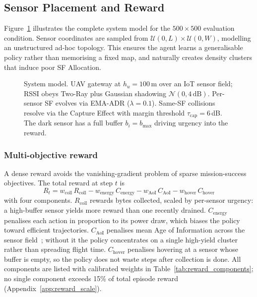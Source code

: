\subsection{Sensor Placement and Reward}

Figure~\ref{fig:system_model} illustrates the complete system model
for the $500\times 500$ evaluation condition. Sensor coordinates are
sampled from $\mathcal{U}(0, L)\times\mathcal{U}(0, W)$, modelling an
unstructured ad-hoc topology. This ensures the agent learns a
generalisable policy rather than memorising a fixed map, and
naturally creates density clusters that induce poor SF Allocation.

\begin{figure}[htbp]
    \centering
    \resizebox{0.95\linewidth}{!}{}
    \caption{System model. UAV gateway at $h_u = 100$\,m over an
    IoT sensor field; RSSI obeys Two-Ray plus Gaussian shadowing
    $\mathcal{N}(0, 4\,\mathrm{dB})$. Per-sensor SF evolves via
    EMA-ADR ($\lambda = 0.1$). Same-SF collisions resolve via the
    Capture Effect with margin threshold
    $\tau_{\mathrm{cap}} = 6$\,dB. The dark sensor has a full buffer
    $b_i = b_{\max}$ driving urgency into the reward.}
    \label{fig:system_model}
\end{figure}

\subsubsection{Multi-objective reward}
\label{sec:reward}

A dense reward avoids the vanishing-gradient problem of sparse mission-success objectives. The total reward at step $t$ is
\begin{equation}
    R_t = w_{\mathrm{coll}}\,R_{\mathrm{coll}}
        - w_{\mathrm{energy}}\,C_{\mathrm{energy}}
        - w_{\mathrm{AoI}}\,C_{\mathrm{AoI}}
        - w_{\mathrm{hover}}\,C_{\mathrm{hover}}
    \label{eq:reward}
\end{equation}
with four components. $R_{\mathrm{coll}}$ rewards bytes collected, scaled by per-sensor urgency: a high-buffer sensor yields more reward than one recently drained. $C_{\mathrm{energy}}$ penalises each action in proportion to its power draw, which biases the policy toward efficient trajectories. $C_{\mathrm{AoI}}$ penalises mean Age of Information across the sensor field~\cite{kaul2012realtime,abdelmagid2019aoi}; without it the policy concentrates on a single high-yield cluster rather than spreading flight time. $C_{\mathrm{hover}}$ penalises hovering at a sensor whose buffer is empty, so the policy does not waste steps after collection is done. All components are listed with calibrated weights in Table~\ref{tab:reward_components}; no single component exceeds 15\% of total episode reward (Appendix~\ref{app:reward_scale}).

